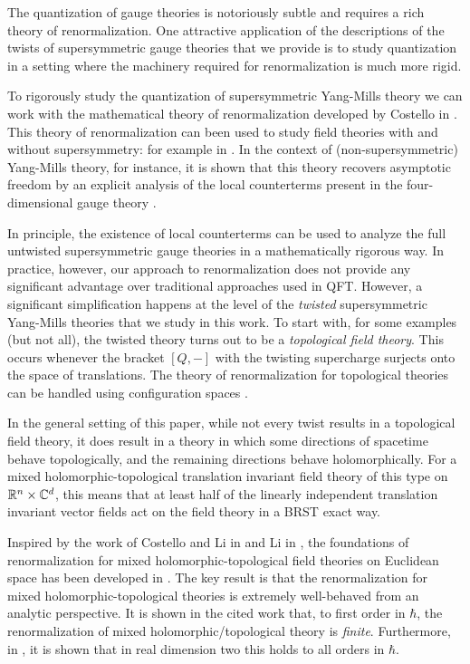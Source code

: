 \documentclass[10pt, oneside]{article}
\begin{document}
The quantization of gauge theories is notoriously subtle and requires a rich theory of renormalization.  One attractive application of the descriptions of the twists of supersymmetric gauge theories that we provide is to study quantization in a setting where the machinery required for renormalization is much more rigid.

To rigorously study the quantization of supersymmetric Yang-Mills theory we can work with the mathematical theory of renormalization developed by Costello in \cite{CostelloBook}. This theory of renormalization can been used to study field theories with and without supersymmetry: for example in \cite{CostelloWittengenus, LiLi, BCOV1, ChanLeungLi, GradyLiLi}. In the context of (non-supersymmetric) Yang-Mills theory, for instance, it is shown that this theory recovers asymptotic freedom by an explicit analysis of the local counterterms present in the four-dimensional gauge theory \cite{EWY}.  

In principle, the existence of local counterterms can be used to analyze the full untwisted supersymmetric gauge theories in a mathematically rigorous way.  In practice, however, our approach to renormalization does not provide any significant advantage over traditional approaches used in QFT.  However, a significant simplification happens at the level of the {\em twisted} supersymmetric Yang-Mills theories that we study in this work. To start with, for some examples (but not all), the twisted theory turns out to be a {\em topological field theory}.  This occurs whenever the bracket $[Q,-]$ with the twisting supercharge surjects onto the space of translations. The theory of renormalization for topological theories can be handled using configuration spaces \cite{Kontsevich, AxelrodSinger}. 

In the general setting of this paper, while not every twist results in a topological field theory, it does result in a theory in which some directions of spacetime behave topologically, and the remaining directions behave holomorphically. For a mixed holomorphic-topological translation invariant field theory of this type on $\mathbb R^n \times \mathbb C^d$, this means that at least half of the linearly independent translation invariant vector fields act on the field theory in a BRST exact way.

Inspired by the work of Costello and Li in \cite{BCOV1} and Li in \cite{LiFeynman, LiVertex}, the foundations of renormalization for mixed holomorphic-topological field theories on Euclidean space has been developed in \cite{BWhol}. The key result is that the renormalization for mixed holomorphic-topological theories is extremely well-behaved from an analytic perspective. It is shown in the cited work that, to first order in $\hbar$, the renormalization of mixed holomorphic/topological theory is {\em finite}. Furthermore, in \cite{LiVertex}, it is shown that in real dimension two this holds to all orders in $\hbar$. 
\end{document}
